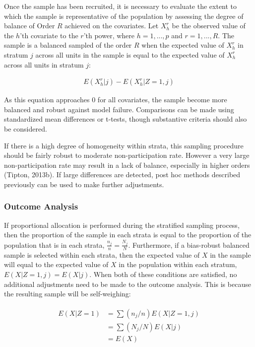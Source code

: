 \documentclass[man,floatsintext]{apa6}
\theoremstyle{definition}
\theoremstyle{definition}
\theoremstyle{definition}
\theoremstyle{remark}
\begin{document}
Once the sample has been recruited, it is necessary to evaluate the
extent to which the sample is representative of the population by
assessing the degree of balance of Order \(R\) achieved on the
covariates. Let \(X^r_h\) be the observed value of the \(h\)'th
covariate to the \(r\)'th power, where \(h = {1, ..., p}\) and
\(r = {1, ..., R}\). The sample is a balanced sampled of the order \(R\)
when the expected value of \(X^r_h\) in stratum \(j\) across all units
in the sample is equal to the expected value of \(X^r_h\) across all
units in stratum \(j\):

\begin{align}
  E(X^r_h|j) - E(X^r_h|Z = 1, j)
\end{align}

As this equation approaches 0 for all covariates, the sample become more
balanced and robust against model failure. Comparisons can be made using
standardized mean differences or t-tests, though substantive criteria
should also be considered.

If there is a high degree of homogeneity within strata, this sampling
procedure should be fairly robust to moderate non-participation rate.
However a very large non-participation rate may result in a lack of
balance, especially in higher orders (Tipton, 2013b). If large
differences are detected, post hoc methods described previously can be
used to make further adjustments.

\hypertarget{outcome-analysis}{%
\subsubsection{Outcome Analysis}\label{outcome-analysis}}

If proportional allocation is performed during the stratified sampling
process, then the proportion of the sample in each strata is equal to
the proportion of the population that is in each strata,
\(\frac{n_j}{n} = \frac{N_j}{N}\). Furthermore, if a bias-robust
balanced sample is selected within each strata, then the expected value
of \(X\) in the sample will equal to the expected value of \(X\) in the
population within each stratum, \(E(X|Z=1,j) = E(X|j)\). When both of
these conditions are satisfied, no additional adjustments need to be
made to the outcome analysis. This is because the resulting sample will
be self-weighing:

\begin{align}
  \begin{split}
    E(X | Z = 1) &= \sum{(n_j/n)E(X | Z = 1, j)} \\
      &= \sum{(N_j/N)E(X | j)} \\
      &= E(X)
  \end{split}
\end{align}
\end{document}

